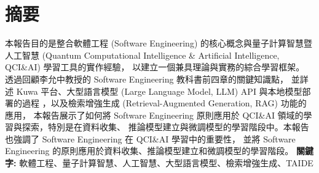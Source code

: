 \documentclass[twocolumn,11pt,a4paper]{article}
\begin{document}

\section*{摘要}
本報告目的是整合軟體工程 (Software Engineering) 
的核心概念與量子計算智慧暨人工智慧 (Quantum Computational Intelligence \& 
Artificial Intelligence, QCI\&AI) 學習工具的實作經驗，
以建立一個兼具理論與實務的綜合學習框架。
透過回顧李允中教授的 Software Engineering 教科書前四章的關鍵知識點，
並詳述 Kuwa 平台、大型語言模型 (Large Language Model, LLM) API 與本地模型部署的過程
，以及檢索增強生成 (Retrieval-Augmented Generation, RAG) 功能的應用，
本報告展示了如何將 Software Engineering 原則應用於 QCI\&AI 領域的學習與探索，特別是在資料收集、
推論模型建立與微調模型的學習階段中。本報告也強調了 Software Engineering 在 QCI\&AI 學習中的重要性，
並將 Software Engineering 的原則應用於資料收集、推論模型建立和微調模型的學習階段。
\linebreak \linebreak 
\noindent \textbf{關鍵字:} 軟體工程、量子計算智慧、人工智慧、大型語言模型、檢索增強生成、TAIDE
\end{document}

